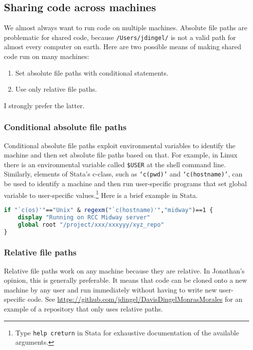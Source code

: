 \subsection{Sharing code across machines}

We almost always want to run code on multiple machines.
Absolute file paths are problematic for shared code, because \texttt{/Users/jdingel/} is not a valid path for almost every computer on earth.
Here are two possible means of making shared code run on many machines: 
\begin{enumerate}
	\item Set absolute file paths with conditional statements.
	\item Use only relative file paths.
\end{enumerate}

I strongly prefer the latter.

\subsubsection{Conditional absolute file paths}

Conditional absolute file paths exploit environmental variables to identify the machine and then set absolute file paths based on that.
For example, in Linux there is an environmental variable called \texttt{\$USER} at the shell command line.
Similarly, elements of Stata's c-class, such as \texttt{`c(pwd)'} and \texttt{`c(hostname)'}, can be used to identify a machine 
and then run user-specific programs that set global variable to user-specific values.\footnote{
	Type \texttt{help creturn} in Stata for exhaustive documentation of the available arguments.
}
Here is a brief example in Stata.
\begin{lstlisting}[language=stata]
if "`c(os)'"=="Unix" & regexm("`c(hostname)'","midway")==1 {
	display "Running on RCC Midway server"
	global root "/project/xxx/xxxyyy/xyz_repo"
}
\end{lstlisting}

\subsubsection{Relative file paths}

Relative file paths work on any machine because they are relative.
In Jonathan's opinion, this is generally preferable.
It means that code can be cloned onto a new machine by any user and run immediately without having to write new user-specific code.
See \url{https://github.com/jdingel/DavisDingelMonrasMorales} for an example of a repository that only uses relative paths.

